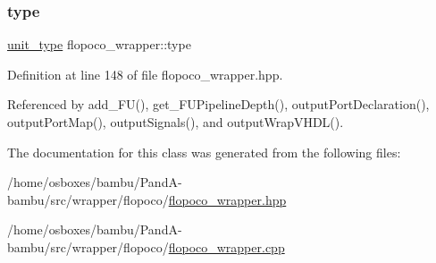 \subsubsection{\texorpdfstring{type}{type}}
{\footnotesize\ttfamily \hyperlink{classflopoco__wrapper_a5e24209a3f08ad68bcc6e69ce2924358}{unit\+\_\+type} flopoco\+\_\+wrapper\+::type\hspace{0.3cm}{\ttfamily [private]}}



Definition at line 148 of file flopoco\+\_\+wrapper.\+hpp.



Referenced by add\+\_\+\+F\+U(), get\+\_\+\+F\+U\+Pipeline\+Depth(), output\+Port\+Declaration(), output\+Port\+Map(), output\+Signals(), and output\+Wrap\+V\+H\+D\+L().



The documentation for this class was generated from the following files\+:\begin{DoxyCompactItemize}
\item 
/home/osboxes/bambu/\+Pand\+A-\/bambu/src/wrapper/flopoco/\hyperlink{flopoco__wrapper_8hpp}{flopoco\+\_\+wrapper.\+hpp}\item 
/home/osboxes/bambu/\+Pand\+A-\/bambu/src/wrapper/flopoco/\hyperlink{flopoco__wrapper_8cpp}{flopoco\+\_\+wrapper.\+cpp}\end{DoxyCompactItemize}
